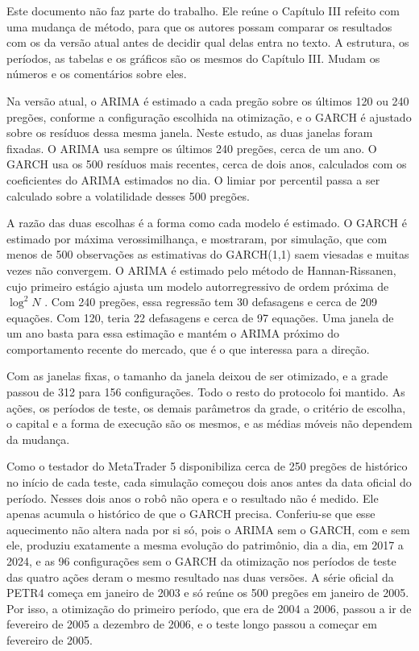 Este documento não faz parte do trabalho. Ele reúne o Capítulo III refeito com
uma mudança de método, para que os autores possam comparar os resultados com os
da versão atual antes de decidir qual delas entra no texto. A estrutura, os
períodos, as tabelas e os gráficos são os mesmos do Capítulo III. Mudam os
números e os comentários sobre eles.

Na versão atual, o ARIMA é estimado a cada pregão sobre os últimos 120 ou 240
pregões, conforme a configuração escolhida na otimização, e o GARCH é ajustado
sobre os resíduos dessa mesma janela. Neste estudo, as duas janelas foram
fixadas. O ARIMA usa sempre os últimos 240 pregões, cerca de um ano. O GARCH
usa os 500 resíduos mais recentes, cerca de dois anos, calculados com os
coeficientes do ARIMA estimados no dia. O limiar por percentil passa a ser
calculado sobre a volatilidade desses 500 pregões.

A razão das duas escolhas é a forma como cada modelo é estimado. O GARCH é
estimado por máxima verossimilhança, e  mostraram, por
simulação, que com menos de 500 observações as estimativas do GARCH(1,1) saem
viesadas e muitas vezes não convergem. O ARIMA é estimado pelo método de
Hannan-Rissanen, cujo primeiro estágio ajusta um modelo autorregressivo de ordem
próxima de $\log^2 N$ \cite{gomez1998}. Com 240 pregões, essa regressão tem 30
defasagens e cerca de 209 equações. Com 120, teria 22 defasagens e cerca de 97
equações. Uma janela de um ano basta para essa estimação e mantém o ARIMA
próximo do comportamento recente do mercado, que é o que interessa para a
direção.

Com as janelas fixas, o tamanho da janela deixou de ser otimizado, e a grade
passou de 312 para 156 configurações. Todo o resto do protocolo foi mantido.
As ações, os períodos de teste, os demais parâmetros da grade, o critério de
escolha, o capital e a forma de execução são os mesmos, e as médias móveis não
dependem da mudança.

Como o testador do MetaTrader 5 disponibiliza cerca de 250 pregões de histórico
no início de cada teste, cada simulação começou dois anos antes da data oficial
do período. Nesses dois anos o robô não opera e o resultado não é medido. Ele
apenas acumula o histórico de que o GARCH precisa. Conferiu-se que esse
aquecimento não altera nada por si só, pois o ARIMA sem o GARCH, com e sem ele,
produziu exatamente a mesma evolução do patrimônio, dia a dia, em 2017 a 2024, e
as 96 configurações sem o GARCH da otimização nos períodos de teste das quatro
ações deram o mesmo resultado nas duas versões. A
série oficial da PETR4 começa em janeiro de 2003 e só reúne os 500 pregões em
janeiro de 2005. Por isso, a otimização do primeiro período, que era de 2004 a
2006, passou a ir de fevereiro de 2005 a dezembro de 2006, e o teste longo
passou a começar em fevereiro de 2005.
